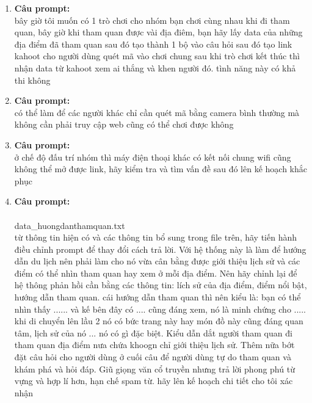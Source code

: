 \begin{enumerate}
\item \textbf{Câu prompt:} \\
\* bây giờ tôi muốn có 1 trò chơi cho nhóm bạn chơi cùng nhau khi đi tham quan, bây giờ khi tham quan được vài địa điêm, bạn hãy lấy data của những địa điểm đã tham quan sau đó tạo thành 1 bộ vào câu hỏi sau đó tạo link kahoot cho người dùng quét mã vào chơi chung sau khi trò chơi kết thúc thì nhận data từ kahoot xem ai thắng và khen người đó. tình năng này có khả thi không \\



\item \textbf{Câu prompt:} \\
\* có thể làm để các người khác chỉ cần quét mã bằng camera bình thường mà không cần phải truy cập web cũng có thể chơi được không \\



\item \textbf{Câu prompt:} \\
\* ở chế độ đấu trí nhóm thì máy điện thoại khác có kết nối chung wifi cũng không thể mở được link, hãy kiểm tra và tìm vấn đề sau đó lên kế hoạch khắc phục \\



\item \textbf{Câu prompt:} \\
\* \\

data\_huongdanthamquan.txt \\
 từ thông tin hiện có và các thông tin bổ sung trong file trên, hãy tiến hành điều chỉnh prompt để thay đổi cách trả lời. Với hệ thống này là làm để hướng dẫn du lịch nên phải làm cho nó vừa cân bằng được giới thiệu lịch sử và các điểm có thể nhìn tham quan hay xem ở mỗi địa điểm. Nên hãy chỉnh lại để hệ thông phản hồi cần bằng các thông tin: lích sử của địa điểm, điểm nổi bật, hướng dẫn tham quan. cái hướng dẫn tham quan thì nên kiểu là: bạn có thể nhìn thấy ...... và kế bên đây có .... cũng đáng xem, nó là minh chứng cho ..... khi di chuyển lên lầu 2 nó có bức trang này hay món đồ này cũng đáng quan tâm, lịch sử của nó ... nó có gì đặc biệt. Kiểu dẫn dắt người tham quan đi tham quan địa điểm nưa  chứa khoogn chỉ giới thiệu lịch sử. Thêm nữa bớt đặt câu hỏi cho người dùng ở cuối câu để người dùng tự do tham quan và khám phá và hỏi đáp. Giũ giọng văn cổ truyền nhưng trả lời phong phú từ vựng và hợp lí hơn, hạn chế spam từ. hãy lên kế hoạch chi tiết cho tôi xác nhận \\



\end{enumerate}
